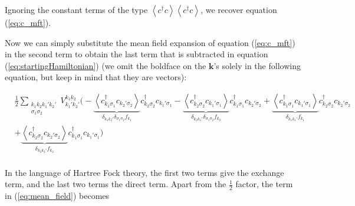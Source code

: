 Ignoring the constant terms of the type $\left\langle c^\dagger c \right\rangle \left\langle c^\dagger c \right\rangle$, we recover equation (\ref{eq:c_mft}).

Now we can simply substitute the mean field expansion of equation (\ref{eq:c_mft}) in the second term to  obtain the last term that is subtracted in equation (\ref{eq:startingHamiltonian}) (we omit the boldface on the $\bm k$'s solely in the following equation, but keep in mind that they are vectors):

\begin{equation}\label{eq:mean_field}
\begin{split}
&\frac{1}{2} \sum_{\substack{ k_1 k_2 k_1' k_2' \\ \sigma_1 \sigma_2} } V^{k_1 k_2}_{k_1' k_2'} \bigg( - \underbrace{\left\langle c_{k_1 \sigma_1}^\dagger c_{k_2' \sigma_2} \right\rangle}_{\delta_{k_1 k_2'} \delta_{\sigma_1 \sigma_2} f_{k_1} } c_{k_2 \sigma_2}^\dagger c_{k_1' \sigma_1}  - \underbrace{\left\langle c_{k_2 \sigma_2}^\dagger c_{k_1' \sigma_1}  \right\rangle}_{\delta_{k_2 k_1'} \delta_{\sigma_1 \sigma_2} f_{k_2} } c_{k_1 \sigma_1}^\dagger c_{k_2' \sigma_2} + \underbrace{\left\langle c_{k_1 \sigma_1}^\dagger c_{k_1' \sigma_1} \right\rangle}_{\delta_{k_1 k_1'} f_{k_1} } c_{k_2 \sigma_2}^\dagger c_{k_2' \sigma_2}  \\
& + \underbrace{\left\langle c_{k_2 \sigma_2}^\dagger c_{k_2' \sigma_2} \right\rangle}_{\delta_{k_2 k_2'} f_{k_2} } c_{k_1 \sigma_1}^\dagger c_{k_1' \sigma_1} \bigg)\\
\end{split}
\end{equation}

In the language of Hartree Fock theory, the first two terms give the exchange term, and the last two terms the direct term. Apart from the $\frac{1}{2}$ factor, the term in (\ref{eq:mean_field}) becomes


